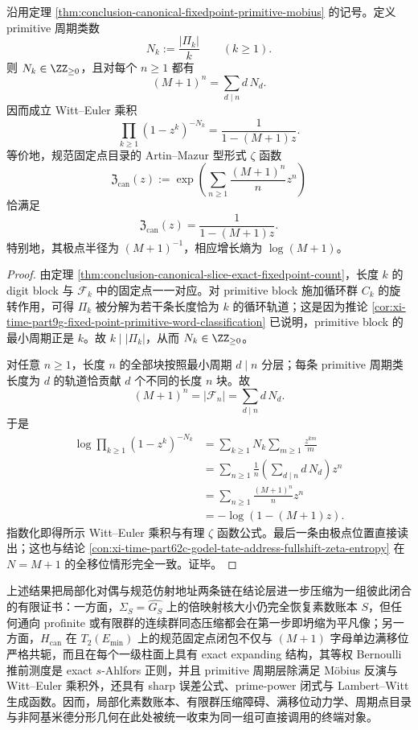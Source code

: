 \begin{corollary}\label{cor:conclusion-canonical-fixedpoint-witt-euler-rational-zeta}
沿用定理 \ref{thm:conclusion-canonical-fixedpoint-primitive-mobius} 的记号。定义 primitive 周期类数
\[
N_k:=\frac{|\Pi_k|}{k}
\qquad(k\ge 1).
\]
则 \(N_k\in\ZZ_{\ge 0}\)，且对每个 \(n\ge 1\) 都有
\[
(M+1)^n=\sum_{d\mid n}d\,N_d.
\]
因而成立 Witt--Euler 乘积
\[
\prod_{k\ge 1}(1-z^k)^{-N_k}=\frac{1}{1-(M+1)z}.
\]
等价地，规范固定点目录的 Artin--Mazur 型形式 \(\zeta\) 函数
\[
\mathfrak Z_{\mathrm{can}}(z)
:=
\exp\!\left(\sum_{n\ge 1}\frac{(M+1)^n}{n}z^n\right)
\]
恰满足
\[
\mathfrak Z_{\mathrm{can}}(z)=\frac{1}{1-(M+1)z}.
\]
特别地，其极点半径为 \((M+1)^{-1}\)，相应增长熵为 \(\log(M+1)\)。
\end{corollary}
\begin{proof}
由定理 \ref{thm:conclusion-canonical-slice-exact-fixedpoint-count}，长度 \(k\) 的 digit block 与 \(\mathcal F_k\) 中的固定点一一对应。对 primitive block 施加循环群 \(C_k\) 的旋转作用，可得 \(\Pi_k\) 被分解为若干条长度恰为 \(k\) 的循环轨道；这是因为推论 \ref{cor:xi-time-part9g-fixed-point-primitive-word-classification} 已说明，primitive block 的最小周期正是 \(k\)。故 \(k\mid |\Pi_k|\)，从而 \(N_k\in\ZZ_{\ge 0}\)。

对任意 \(n\ge 1\)，长度 \(n\) 的全部块按照最小周期 \(d\mid n\) 分层；每条 primitive 周期类长度为 \(d\) 的轨道恰贡献 \(d\) 个不同的长度 \(n\) 块。故
\[
(M+1)^n=|\mathcal F_n|=\sum_{d\mid n}d\,N_d.
\]
于是
\[
\begin{aligned}
\log\prod_{k\ge 1}(1-z^k)^{-N_k}
&=
\sum_{k\ge 1}N_k\sum_{m\ge 1}\frac{z^{km}}{m}\\
&=
\sum_{n\ge 1}\frac{1}{n}\left(\sum_{d\mid n}d\,N_d\right)z^n\\
&=
\sum_{n\ge 1}\frac{(M+1)^n}{n}z^n\\
&=
-\log(1-(M+1)z).
\end{aligned}
\]
指数化即得所示 Witt--Euler 乘积与有理 \(\zeta\) 函数公式。最后一条由极点位置直接读出；这也与结论 \ref{con:xi-time-part62c-godel-tate-address-fullshift-zeta-entropy} 在 \(N=M+1\) 的全移位情形完全一致。证毕。
\end{proof}



上述结果把局部化对偶与规范仿射地址两条链在结论层进一步压缩为一组彼此闭合的有限证书：一方面，\(\Sigma_S=\widehat{G_S}\) 上的倍映射核大小仍完全恢复素数账本 \(S\)，但任何通向 profinite 或有限群的连续群同态压缩都会在第一步即坍缩为平凡像；另一方面，\(H_{\mathrm{can}}\) 在 \(T_2(E_{\min})\) 上的规范固定点闭包不仅与 \((M+1)\) 字母单边满移位严格共轭，而且在每个一级柱面上具有 exact expanding 结构，其等权 Bernoulli 推前测度是 exact \(s\)-Ahlfors 正则，并且 primitive 周期层除满足 Möbius 反演与 Witt--Euler 乘积外，还具有 sharp 误差公式、prime-power 闭式与 Lambert--Witt 生成函数。因而，局部化素数账本、有限群压缩障碍、满移位动力学、周期点目录与非阿基米德分形几何在此处被统一收束为同一组可直接调用的终端对象。

\endinput
